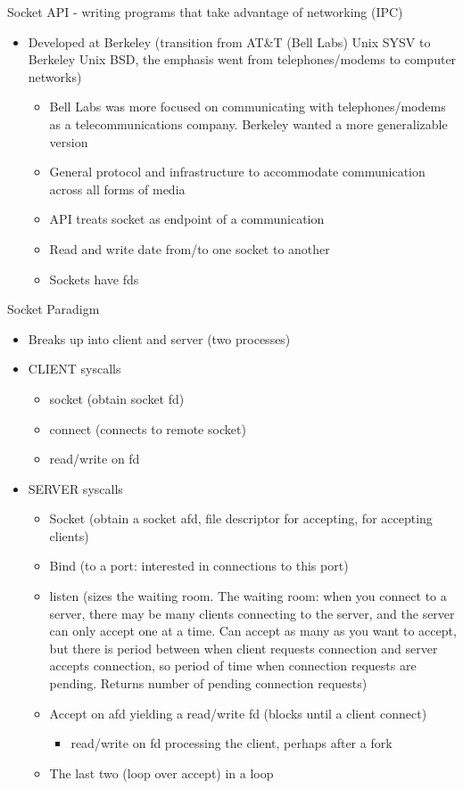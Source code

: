Socket API - writing programs that take advantage of networking (IPC)\vspace{0.15in}\\
\begin{itemize}
    \item Developed at Berkeley (transition from AT\&T (Bell Labs) Unix SYSV to Berkeley Unix BSD, the emphasis went from telephones/modems to computer networks)
    \begin{itemize}
        \item Bell Labs was more focused on communicating with telephones/modems as a telecommunications company. Berkeley wanted a more generalizable version
        \item General protocol and infrastructure to accommodate communication across all forms of media
        \item API treats socket as endpoint of a communication
        \item Read and write date from/to one socket to another
        \item Sockets have fds
    \end{itemize}
\end{itemize}
Socket Paradigm
\begin{itemize}
    \item Breaks up into client and server (two processes)
    \item CLIENT syscalls
    \begin{itemize}
        \item socket (obtain socket fd)
        \item connect (connects to remote socket)
        \item read/write on fd
    \end{itemize}
    \item SERVER syscalls
    \begin{itemize}
        \item Socket (obtain a socket afd, file descriptor for accepting, for accepting clients)
        \item Bind (to a port: interested in connections to this port)
        \item listen (sizes the waiting room. The waiting room: when you connect to a server, there may be many clients connecting to the server, and the server can only accept one at a time. Can accept as many as you want to accept, but there is period between when client requests connection and server accepts connection, so period of time when connection requests are pending. Returns number of pending connection requests)
        \item Accept on afd yielding a read/write fd (blocks until a client connect)
        \begin{itemize}
            \item read/write on fd processing the client, perhaps after a fork
        \end{itemize}
        \item The last two (loop over accept) in a loop
    \end{itemize}
\end{itemize}
